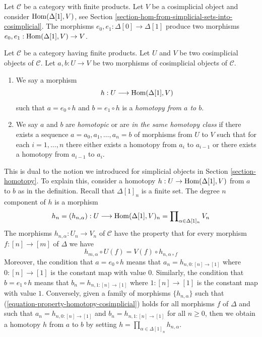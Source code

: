 \noindent
Let $\mathcal{C}$ be a category with finite products. Let $V$ be a
cosimplicial object and consider $\mathop{\mathrm{Hom}}\nolimits(\Delta[1], V)$, see
Section \ref{section-hom-from-simplicial-sets-into-cosimplicial}.
The morphisms $e_0, e_1 : \Delta[0] \to \Delta[1]$
produce two morphisms $e_0, e_1 : \mathop{\mathrm{Hom}}\nolimits(\Delta[1], V) \to V$.

\begin{definition}
\label{definition-homotopy-cosimplicial}
Let $\mathcal{C}$ be a category having finite products.
Let $U$ and $V$ be two cosimplicial objects of $\mathcal{C}$.
Let $a, b : U \to V$ be two morphisms of cosimplicial objects
of $\mathcal{C}$.
\begin{enumerate}
\item We say a morphism
$$
h : U \longrightarrow \mathop{\mathrm{Hom}}\nolimits(\Delta[1], V)
$$
such that $a = e_0 \circ h$ and $b = e_1 \circ h$ is a
{\it homotopy from $a$ to $b$}.
\item We say $a$ and $b$ are {\it homotopic} or are
{\it in the same homotopy class} if there exists a sequence
$a = a_0, a_1, \ldots, a_n = b$ of morphisms from $U$ to $V$
such that for each $i = 1, \ldots, n$ there either exists a
homotopy from $a_i$ to $a_{i - 1}$ or there exists a homotopy
from $a_{i - 1}$ to $a_i$.
\end{enumerate}
\end{definition}

\noindent
This is dual to the notion we introduced for simplicial objects in
Section \ref{section-homotopy}. To explain this, consider a
homotopy $h : U \to \mathop{\mathrm{Hom}}\nolimits(\Delta[1], V)$ from $a$ to $b$ as
in the definition. Recall that $\Delta[1]_n$ is a finite
set. The degree $n$ component of $h$ is a morphism
$$
h_n = (h_{n, \alpha}) :
U
\longrightarrow
\mathop{\mathrm{Hom}}\nolimits(\Delta[1], V)_n =
\prod\nolimits_{\alpha \in \Delta[1]_n} V_n
$$
The morphisms $h_{n, \alpha} : U_n \to V_n$ of $\mathcal{C}$ have the
property that for every morphism $f : [n] \to [m]$
of $\Delta$ we have
\begin{equation}
\label{equation-property-homotopy-cosimplicial}
h_{m, \alpha} \circ U(f) = V(f) \circ h_{n, \alpha \circ f}
\end{equation}
Moreover, the condition that $a = e_0 \circ h$ means that
$a_n = h_{n, 0 : [n] \to [1]}$ where $0 : [n] \to [1]$ is the
constant map with value $0$. Similarly, the condition that
$b = e_1 \circ h$ means that $b_n = h_{n, 1 : [n] \to [1]}$
where $1 : [n] \to [1]$ is the constant map with value $1$.
Conversely, given a family of morphisms $\{h_{n, \alpha}\}$
such that (\ref{equation-property-homotopy-cosimplicial})
holds for all morphisms $f$ of $\Delta$ and such that
$a_n = h_{n, 0 : [n] \to [1]}$ and $b_n = h_{n, 1 : [n] \to [1]}$
for all $n \geq 0$, then we obtain a homotopy $h$ from $a$ to $b$ by setting
$h = \prod_{\alpha \in \Delta[1]_n} h_{n, \alpha}$.

